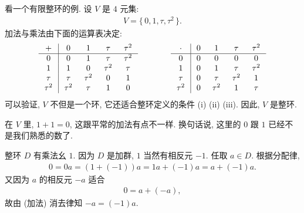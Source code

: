 \begin{example}
    看一个有限整环的例. 设 $V$  是 $4$ 元集:
    \begin{align*}
        V = \{\, 0,1,\tau,\tau^2 \,\}.
    \end{align*}
    加法与乘法由下面的运算表决定:
    \begin{align*}
        \arraycolsep=0.25cm
        \begin{array}{c|cccc}
            +      & 0      & 1      & \tau   & \tau^2 \\ \hline
            0      & 0      & 1      & \tau   & \tau^2 \\
            1      & 1      & 0      & \tau^2 & \tau   \\
            \tau   & \tau   & \tau^2 & 0      & 1      \\
            \tau^2 & \tau^2 & \tau   & 1      & 0      \\
        \end{array}
        \qquad \qquad
        \begin{array}{c|cccc}
            \cdot  & 0 & 1      & \tau   & \tau^2 \\ \hline
            0      & 0 & 0      & 0      & 0      \\
            1      & 0 & 1      & \tau   & \tau^2 \\
            \tau   & 0 & \tau   & \tau^2 & 1      \\
            \tau^2 & 0 & \tau^2 & 1      & \tau   \\
        \end{array}
    \end{align*}
    可以验证, $V$ 不但是一个环, 它还适合整环定义的条件 (i) (ii) (iii). 因此, $V$ 是整环.

    在 $V$ 里, $1+1=0$, 这跟平常的加法有点不一样. 换句话说, 这里的 $0$ 跟 $1$ 已经不是我们熟悉的数了.
\end{example}

\begin{remark}
    整环 $D$ 有乘法幺 $1$. 因为 $D$ 是加群, $1$ 当然有相反元 $-1$. 任取 $a \in D$. 根据分配律,
    \begin{align*}
        0 = 0a = (1 + (-1))a = 1a + (-1)a = a + (-1)a.
    \end{align*}
    又因为 $a$ 的相反元 $-a$ 适合
    \begin{align*}
        0 = a + (-a),
    \end{align*}
    故由 (加法) 消去律知 $-a = (-1)a$.
\end{remark}

